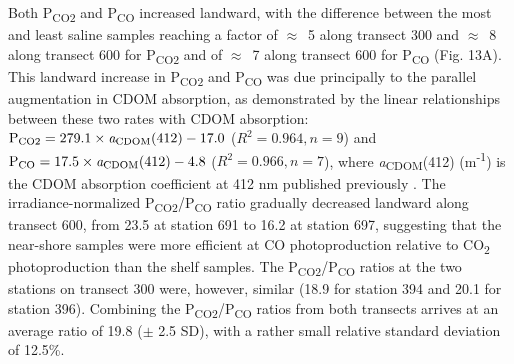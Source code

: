 \documentclass[essd, manuscript]{copernicus}
\begin{document}
Both P\textsubscript{CO2} and P\textsubscript{CO} increased landward, with the difference between the most and least saline samples reaching a factor of $\approx$~5 along transect 300 and $\approx$~8 along transect 600 for P\textsubscript{CO2} and of $\approx$~7 along transect 600 for P\textsubscript{CO} (Fig. 13A). This landward increase in P\textsubscript{CO2} and P\textsubscript{CO} was due principally to the parallel augmentation in CDOM absorption, as demonstrated by the linear relationships between these two rates with CDOM absorption: $\text{P}\textsubscript{CO2} = 279.1\times\textit{a}\textsubscript{CDOM}(412) - 17.0$ ($R^2 = 0.964, n = 9$) and $\text{P}\textsubscript{CO} = 17.5\times\textit{a}\textsubscript{CDOM}(412) - 4.8$ ($R^2 = 0.966, n = 7$), where \textit{a}\textsubscript{CDOM}(412) (m\textsuperscript{-1}) is the CDOM absorption coefficient at 412 nm published previously \citep{Song2013, Taalba2013}. The irradiance-normalized P\textsubscript{CO2}/P\textsubscript{CO} ratio gradually decreased landward along transect 600, from 23.5 at station 691 to 16.2 at station 697, suggesting that the near-shore samples were more efficient at CO photoproduction relative to CO\textsubscript{2} photoproduction than the shelf samples. The P\textsubscript{CO2}/P\textsubscript{CO} ratios at the two stations on transect 300 were, however, similar (18.9 for station 394 and 20.1 for station 396). Combining the P\textsubscript{CO2}/P\textsubscript{CO} ratios from both transects arrives at an average ratio of 19.8 ($\pm$ 2.5 SD), with a rather small relative standard deviation of 12.5\%.  
\end{document}
